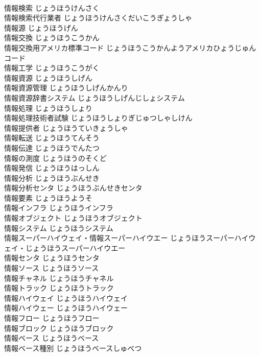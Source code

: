 \documentclass[8pt]{extreport}
\begin{document}
\begin{CJK}{UTF8}{min}
\\	情報検索	じょうほうけんさく	
\\	情報検索代行業者	じょうほうけんさくだいこうぎょうしゃ	
\\	情報源	じょうほうげん	
\\	情報交換	じょうほうこうかん	
\\	情報交換用アメリカ標準コード	じょうほうこうかんようアメリカひょうじゅんコード	
\\	情報工学	じょうほうこうがく	
\\	情報資源	じょうほうしげん	
\\	情報資源管理	じょうほうしげんかんり	
\\	情報資源辞書システム	じょうほうしげんじしょシステム	
\\	情報処理	じょうほうしょり	
\\	情報処理技術者試験	じょうほうしょりぎじゅつしゃしけん	
\\	情報提供者	じょうほうていきょうしゃ	
\\	情報転送	じょうほうてんそう	
\\	情報伝達	じょうほうでんたつ	
\\	情報の測度	じょうほうのそくど	
\\	情報発信	じょうほうはっしん	
\\	情報分析	じょうほうぶんせき	
\\	情報分析センタ	じょうほうぶんせきセンタ	
\\	情報要素	じょうほうようそ	
\\	情報インフラ	じょうほうインフラ	
\\	情報オブジェクト	じょうほうオブジェクト	
\\	情報システム	じょうほうシステム	
\\	情報スーパーハイウェイ・情報スーパーハイウエー	じょうほうスーパーハイウェイ・じょうほうスーパーハイウエー	
\\	情報センタ	じょうほうセンタ	
\\	情報ソース	じょうほうソース	
\\	情報チャネル	じょうほうチャネル	
\\	情報トラック	じょうほうトラック	
\\	情報ハイウェイ	じょうほうハイウェイ	
\\	情報ハイウェー	じょうほうハイウェー	
\\	情報フロー	じょうほうフロー	
\\	情報ブロック	じょうほうブロック	
\\	情報ベース	じょうほうベース	
\\	情報ベース種別	じょうほうベースしゅべつ	

\end{CJK}
\end{document}
